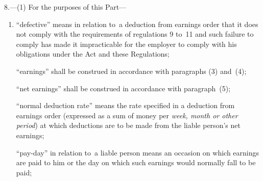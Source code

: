 \documentclass[12pt,a4paper]{article}
\begin{document}
8.—(1) For the purposes of this Part—
\begin{enumerate}\item[]
“defective” means in relation to~a deduction from earnings order that it does not comply with the requirements of regulations 9 to~11 and such failure to comply has made it impracticable for the employer to comply with his obligations under the Act and these Regulations;


“earnings” shall be construed in accordance with paragraphs (3) and~(4);


%

“net earnings” shall be construed in accordance with paragraph~(5);

“normal deduction rate” means the rate specified in a deduction from earnings order (expressed as a sum of money per \emph{week, month or other period}) at which deductions are to be made from the liable person’s net earnings;

“pay-day” in relation to~a liable person means an occasion on which earnings are paid to him or the day on which such earnings would normally fall to be paid;


\end{enumerate}
\end{document}
